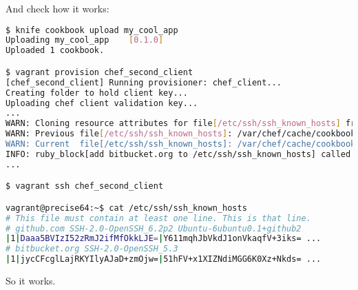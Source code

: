 And check how it works:

\begin{lstlisting}[language=Bash,label=lst:cookbook-hwrp12]
$ knife cookbook upload my_cool_app
Uploading my_cool_app    [0.1.0]
Uploaded 1 cookbook.

$ vagrant provision chef_second_client
[chef_second_client] Running provisioner: chef_client...
Creating folder to hold client key...
Uploading chef client validation key...
...
WARN: Cloning resource attributes for file[/etc/ssh/ssh_known_hosts] from prior resource (CHEF-3694)
WARN: Previous file[/etc/ssh/ssh_known_hosts]: /var/chef/cache/cookbooks/my_cool_app/providers/know_host.rb:39:in `insure_for_file'
WARN: Current  file[/etc/ssh/ssh_known_hosts]: /var/chef/cache/cookbooks/my_cool_app/libraries/provider_known_host.rb:62:in `insure_for_file'
INFO: ruby_block[add bitbucket.org to /etc/ssh/ssh_known_hosts] called
...

$ vagrant ssh chef_second_client

vagrant@precise64:~$ cat /etc/ssh/ssh_known_hosts
# This file must contain at least one line. This is that line.
# github.com SSH-2.0-OpenSSH_6.2p2 Ubuntu-6ubuntu0.1+github2
|1|Daaa5BVIzI52zRmJ2ifMfOkkLJE=|Y611mqhJbVkdJ1onVkaqfV+3iks= ...
# bitbucket.org SSH-2.0-OpenSSH_5.3
|1|jycCFcglLajRKYIlyAJaD+zmOjw=|51hFV+x1XIZNdiMGG6K0Xz+Nkds= ...
\end{lstlisting}

So it works.